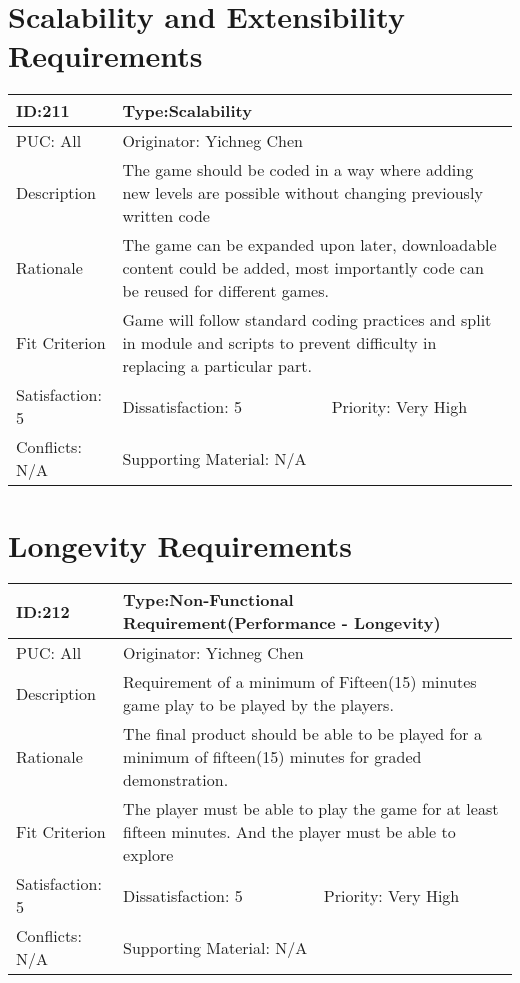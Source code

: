 \documentclass{article}
\begin{document}
	\section{Scalability and Extensibility Requirements}
	\begin{table}[H]
		\begin{tabular}{|l|l|l|}
			\hline
			ID:211 & \multicolumn{2}{l|}{Type:Scalability} \\ \hline
			PUC: All & \multicolumn{2}{l|}{Originator: Yichneg Chen} \\ \hline
			Description & \multicolumn{2}{m{0.85\textwidth}|}{The game should be coded in a way where adding new levels are possible without changing previously written code} \\ \hline
			Rationale & \multicolumn{2}{m{0.85\textwidth}|}{The game can be expanded upon later, downloadable content could be added, most importantly code can be reused for different games.} \\ \hline
			Fit Criterion & \multicolumn{2}{m{0.85\textwidth}|}{Game will follow standard coding practices and split in module and scripts to prevent difficulty in replacing a particular part. } \\ \hline
			Satisfaction: 5 & Dissatisfaction: 5 & Priority: Very High \\ \hline
			Conflicts: N/A & \multicolumn{2}{l|}{Supporting Material: N/A} \\ \hline
		\end{tabular}
	\end{table}

	\section{Longevity Requirements}
	\begin{table}[H]
		\begin{tabular}{|l|l|l|}
			\hline
			ID:212 & \multicolumn{2}{l|}{Type:Non-Functional Requirement(Performance - Longevity)} \\ \hline
			PUC: All & \multicolumn{2}{l|}{Originator: Yichneg Chen} \\ \hline
			Description & \multicolumn{2}{m{0.85\textwidth}|}{Requirement of a minimum of Fifteen(15) minutes game play to be played by the players.} \\ \hline
			Rationale & \multicolumn{2}{m{0.85\textwidth}|}{The final product should be able to be played for a minimum of fifteen(15) minutes for graded demonstration.} \\ \hline
			Fit Criterion & \multicolumn{2}{m{0.85\textwidth}|}{The player must be able to play the game for at least fifteen minutes. And the player must be able to explore} \\ \hline
			Satisfaction: 5 & Dissatisfaction: 5 & Priority: Very High \\ \hline
			Conflicts: N/A & \multicolumn{2}{l|}{Supporting Material: N/A} \\ \hline
		\end{tabular}
	\end{table}
\end{document}
